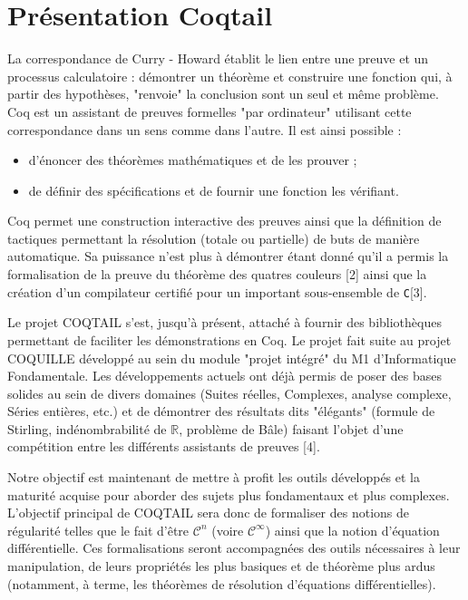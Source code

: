 \documentclass[11pt]{article}
\begin{document}
\section{Présentation Coqtail}


La correspondance de Curry - Howard établit le lien entre une preuve et un processus calculatoire : démontrer un théorème et construire une fonction qui, à partir des hypothèses, "renvoie" la conclusion sont un seul et même problème.
Coq\cite{L:BC04} est un assistant de preuves formelles "par ordinateur" utilisant cette correspondance dans un sens comme dans l'autre. Il est ainsi possible :
\begin{itemize}
  \item d'énoncer des théorèmes mathématiques et de les prouver ;
  \item de définir des spécifications et de fournir une fonction les vérifiant.
\end{itemize}

Coq permet une construction interactive des preuves ainsi que la définition de tactiques permettant la résolution (totale ou partielle) de buts de manière automatique. Sa puissance n'est plus à démontrer étant donné qu'il a permis la formalisation de la preuve du théorème des quatres couleurs [2] ainsi que la création d'un compilateur certifié pour un important sous-ensemble de \texttt{C}[3].

Le projet COQTAIL s'est, jusqu'à présent, attaché à fournir des bibliothèques permettant de faciliter les démonstrations en Coq. Le projet fait suite au projet COQUILLE développé au sein du module "projet intégré" du M1 d'Informatique Fondamentale.
Les développements actuels ont déjà permis de poser des bases solides au sein de divers domaines (Suites réelles, Complexes, analyse complexe, Séries entières, etc.) et de démontrer des résultats dits "élégants" (formule de Stirling, indénombrabilité de $\mathbb{R}$, problème de Bâle) faisant l'objet d'une compétition entre les différents assistants de preuves [4].


Notre objectif est maintenant de mettre à profit les outils développés et la maturité acquise pour aborder des sujets plus fondamentaux et plus complexes. L'objectif principal de COQTAIL sera donc de formaliser des notions de régularité telles que le fait d'être $\mathcal{C}^n$ (voire $\mathcal{C}^\infty$) ainsi que la notion d'équation différentielle. Ces formalisations seront accompagnées des outils nécessaires à leur manipulation, de leurs propriétés les plus basiques et de théorème plus ardus (notamment, à terme, les théorèmes de résolution d'équations différentielles).
\end{document}
